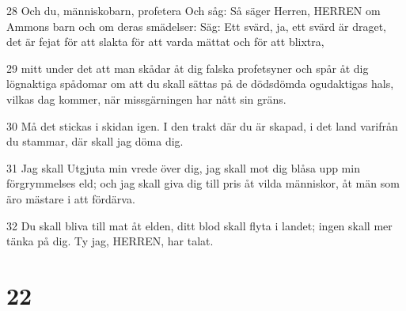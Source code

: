 \par 28 Och du, människobarn, profetera Och såg: Så säger Herren, HERREN om Ammons barn och om deras smädelser: Säg: Ett svärd, ja, ett svärd är draget, det är fejat för att slakta för att varda mättat och för att blixtra,
\par 29 mitt under det att man skådar åt dig falska profetsyner och spår åt dig lögnaktiga spådomar om att du skall sättas på de dödsdömda ogudaktigas hals, vilkas dag kommer, när missgärningen har nått sin gräns.
\par 30 Må det stickas i skidan igen. I den trakt där du är skapad, i det land varifrån du stammar, där skall jag döma dig.
\par 31 Jag skall Utgjuta min vrede över dig, jag skall mot dig blåsa upp min förgrymmelses eld; och jag skall giva dig till pris åt vilda människor, åt män som äro mästare i att fördärva.
\par 32 Du skall bliva till mat åt elden, ditt blod skall flyta i landet; ingen skall mer tänka på dig. Ty jag, HERREN, har talat.

\chapter{22}

